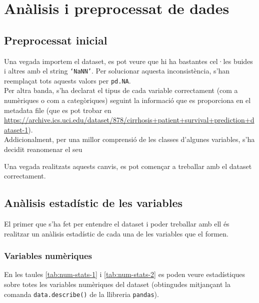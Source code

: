 \section{Anàlisis i preprocessat de dades}

\subsection{Preprocessat inicial}
Una vegada importem el dataset, es pot veure que hi ha bastantes cel·les buides i altres amb el string \texttt{`NaNN'}. Per solucionar aquesta inconsistència, s'han reemplaçat tots aquests valors per \texttt{pd.NA}. \\

Per altra banda, s'ha declarat el tipus de cada variable correctament (com a numèriques o com a categòriques) seguint la informació que es proporciona en el metadata file (que es pot trobar en \url{https://archive.ics.uci.edu/dataset/878/cirrhosis+patient+survival+prediction+dataset-1}).\\

Addicionalment, per una millor comprensió de les classes d'algunes variables, s'ha decidit reanomenar el seu \cite{misc_cirrhosis_patient_survival_prediction_878} 



Una vegada realitzats aquests canvis, es pot començar a treballar amb el dataset correctament.

\subsection{Anàlisis estadístic de les variables}
El primer que s'ha fet per entendre el dataset i poder treballar amb ell és realitzar un anàlisis estadístic de cada una de les variables que el formen. 

\subsubsection{Variables numèriques}
En les taules \ref{tab:num-stats-1} i \ref{tab:num-stats-2} es poden veure estadístiques sobre totes les variables numèriques del dataset (obtingudes mitjançant la comanda \texttt{data.describe()} de la llibreria \texttt{pandas}).

